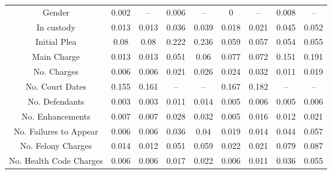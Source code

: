 \begin{table*}[]
\begin{tabular}{@{}ccccc@{\qquad}cccc@{}}
Gender                    & 0.002                 & --                   & 0.006                & --                     & 0                     & --                   & 0.008                & --                   \\
In custody                & 0.013                 & 0.013                & 0.036                & 0.039                  & 0.018                 & 0.021                & 0.045                & 0.052                \\
Initial Plea              & 0.08                  & 0.08                 & 0.222                & 0.236                  & 0.059                 & 0.057                & 0.054                & 0.055                \\
Main Charge               & 0.013                 & 0.013                & 0.051                & 0.06                   & 0.077                 & 0.072                & 0.151                & 0.191                \\
No. Charges               & 0.006                 & 0.006                & 0.021                & 0.026                  & 0.024                 & 0.032                & 0.011                & 0.019                \\
No. Court Dates           & 0.155                 & 0.161                & --                   & --                     & 0.167                 & 0.182                & --                   & --                   \\
No. Defendants            & 0.003                 & 0.003                & 0.011                & 0.014                  & 0.005                 & 0.006                & 0.005                & 0.006                \\
No. Enhancements          & 0.007                 & 0.007                & 0.028                & 0.032                  & 0.005                 & 0.016                & 0.012                & 0.021                \\
No. Failures to Appear    & 0.006                 & 0.006                & 0.036                & 0.04                   & 0.019                 & 0.014                & 0.044                & 0.057                \\
No. Felony Charges        & 0.014                 & 0.012                & 0.051                & 0.059                  & 0.022                 & 0.021                & 0.079                & 0.087                \\
No. Health Code Charges   & 0.006                 & 0.006                & 0.017                & 0.022                  & 0.006                 & 0.011                & 0.036                & 0.055                \\

\end{tabular}
\end{table*}
